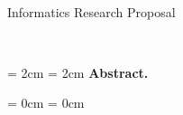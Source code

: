 \thispagestyle{plain}

\begin{center}
  \huge
  \textbf{\@title}\\
  \vspace{.5em}
  \large
  Informatics Research Proposal
  \vspace{.5em}

  \normalsize
  \@author\\
  \@date
  \vspace{.5em}
\end{center}

\newcommand{\abstractmargin}{2cm}

\leftskip  = \abstractmargin
\rightskip = \abstractmargin
\noindent
\textbf{Abstract.}

\leftskip  = 0cm
\rightskip = 0cm

